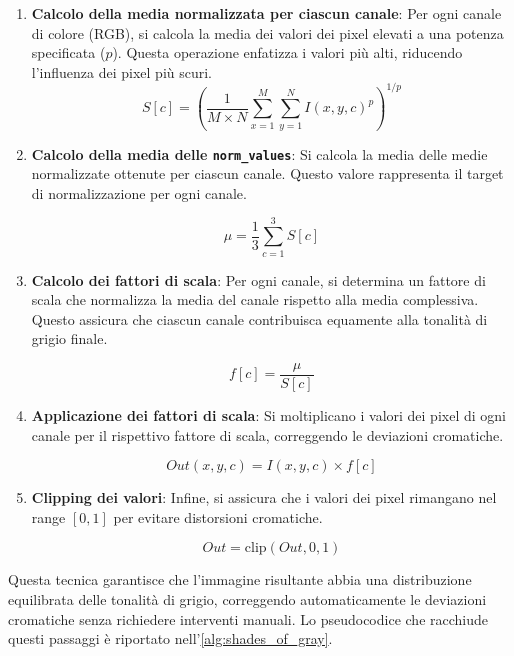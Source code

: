 \begin{enumerate}
    \item \textbf{Calcolo della media normalizzata per ciascun canale}: Per ogni canale di colore (RGB), si calcola la media dei valori dei pixel elevati a una potenza specificata ($p$). Questa operazione enfatizza i valori più alti, riducendo l'influenza dei pixel più scuri.
    $$
    S[c] = \left(\dfrac{1}{M \times N} \sum_{x=1}^{M} \sum_{y=1}^{N} I(x,y,c)^{p} \right)^{1/p}
    $$
    \item \textbf{Calcolo della media delle \texttt{norm\_values}}: Si calcola la media delle medie normalizzate ottenute per ciascun canale. Questo valore rappresenta il target di normalizzazione per ogni canale.

    $$
    \mu = \dfrac{1}{3} \sum_{c=1}^{3} S[c]
    $$

    \item \textbf{Calcolo dei fattori di scala}: Per ogni canale, si determina un fattore di scala che normalizza la media del canale rispetto alla media complessiva. Questo assicura che ciascun canale contribuisca equamente alla tonalità di grigio finale.
    
    $$
    f[c] = \dfrac{\mu}{S[c]}
    $$
    
    \item \textbf{Applicazione dei fattori di scala}: Si moltiplicano i valori dei pixel di ogni canale per il rispettivo fattore di scala, correggendo le deviazioni cromatiche.
    
    $$
    Out(x,y,c) = I(x,y,c) \times f[c]
    $$
    
    \item \textbf{Clipping dei valori}: Infine, si assicura che i valori dei pixel rimangano nel range $[0, 1]$ per evitare distorsioni cromatiche.
    
    $$
    Out = \text{clip}(Out, 0, 1)
    $$

\end{enumerate}


Questa tecnica garantisce che l'immagine risultante abbia una distribuzione equilibrata delle tonalità di grigio, correggendo automaticamente le deviazioni cromatiche senza richiedere interventi manuali.
Lo pseudocodice che racchiude questi passaggi è riportato nell'\cref{alg:shades_of_gray}.

